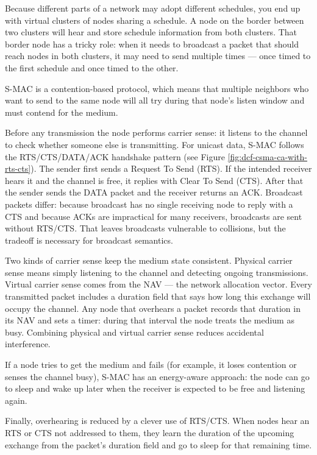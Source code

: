 Because different parts of a network may adopt different schedules, you end up with virtual clusters of nodes sharing a schedule. A node on the border between two clusters will hear and store schedule information from both clusters. That border node has a tricky role: when it needs to broadcast a packet that should reach nodes in both clusters, it may need to send multiple times — once timed to the first schedule and once timed to the other.

S-MAC is a contention-based protocol, which means that multiple neighbors who want to send to the same node will all try during that node’s listen window and must contend for the medium.

Before any transmission the node performs carrier sense: it listens to the channel to check whether someone else is transmitting. 
For unicast data, S-MAC follows the RTS/CTS/DATA/ACK handshake pattern (see Figure \ref{fig:dcf-csma-ca-with-rts-cts}). The sender first sends a Request To Send (RTS). If the intended receiver hears it and the channel is free, it replies with Clear To Send (CTS). After that the sender sends the DATA packet and the receiver returns an ACK.
Broadcast packets differ: because broadcast has no single receiving node to reply with a CTS and because ACKs are impractical for many receivers, broadcasts are sent without RTS/CTS. That leaves broadcasts vulnerable to collisions, but the tradeoff is necessary for broadcast semantics.

Two kinds of carrier sense keep the medium state consistent. Physical carrier sense means simply listening to the channel and detecting ongoing transmissions. Virtual carrier sense comes from the NAV — the network allocation vector. Every transmitted packet includes a duration field that says how long this exchange will occupy the channel. Any node that overhears a packet records that duration in its NAV and sets a timer: during that interval the node treats the medium as busy. Combining physical and virtual carrier sense reduces accidental interference.

If a node tries to get the medium and fails (for example, it loses contention or senses the channel busy), S-MAC has an energy-aware approach: the node can go to sleep and wake up later when the receiver is expected to be free and listening again.

Finally, overhearing is reduced by a clever use of RTS/CTS. When nodes hear an RTS or CTS not addressed to them, they learn the duration of the upcoming exchange from the packet’s duration field and go to sleep for that remaining time. 


